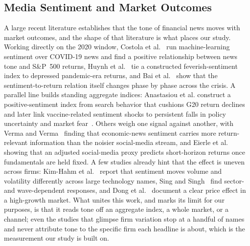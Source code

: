 \documentclass[conference]{IEEEtran}
\begin{document}
\subsection{Media Sentiment and Market Outcomes}
A large recent literature establishes that the tone of financial news moves with
market outcomes, and the shape of that literature is what places our study. Working
directly on the 2020 window, Costola et al.~\cite{costola2023} run machine-learning
sentiment over COVID-19 news and find a positive relationship between news tone and
S\&P~500 returns, Huynh et al.~\cite{huynh2021} tie a constructed feverish-sentiment
index to depressed pandemic-era returns, and Bai et al.~\cite{bai2023} show that the
sentiment-to-return relation itself changes phase by phase across the crisis. A
parallel line builds standing aggregate indices: Anastasiou et al. construct a
positive-sentiment index from search behavior that cushions G20 return
declines~\cite{anastasiou2022} and later link vaccine-related sentiment shocks to
persistent falls in policy uncertainty and market fear~\cite{anastasiou2026}. Others
weigh one signal against another, with Verma and Verma~\cite{verma2025} finding that
economic-news sentiment carries more return-relevant information than the noisier
social-media stream, and Eierle et al.~\cite{eierle2022} showing that an adjusted
social-media proxy predicts short-horizon returns once fundamentals are held fixed. A
few studies already hint that the effect is uneven across firms: Kim-Hahm et
al.~\cite{kimhahm2025} report that sentiment moves volume and volatility differently
across large technology names, Sing and Singh~\cite{sing2023} find sector- and
wave-dependent responses, and Dong et al.~\cite{dong2022} document a clear price
effect in a high-growth market. What unites this work, and marks its limit for our
purposes, is that it reads tone off an aggregate index, a whole market, or a channel;
even the studies that glimpse firm variation stop at a handful of names and never
attribute tone to the specific firm each headline is about, which is the measurement
our study is built on.
\end{document}
